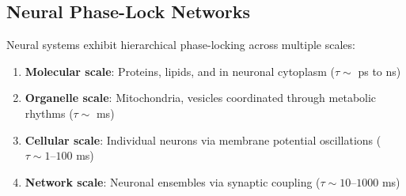 \subsection{Neural Phase-Lock Networks}

\begin{theorem}
\label{thm:neural_phase_lock}
Neural systems exhibit hierarchical phase-locking across multiple scales:
\begin{enumerate}
\item \textbf{Molecular scale}: Proteins, lipids, and  in neuronal cytoplasm ($\tau \sim$ ps to ns)
\item \textbf{Organelle scale}: Mitochondria, vesicles coordinated through metabolic rhythms ($\tau \sim$ ms)
\item \textbf{Cellular scale}: Individual neurons via membrane potential oscillations ($\tau \sim 1$--$100$ ms)
\item \textbf{Network scale}: Neuronal ensembles via synaptic coupling ($\tau \sim 10$--$1000$ ms)
\end{enumerate}
\end{theorem}

